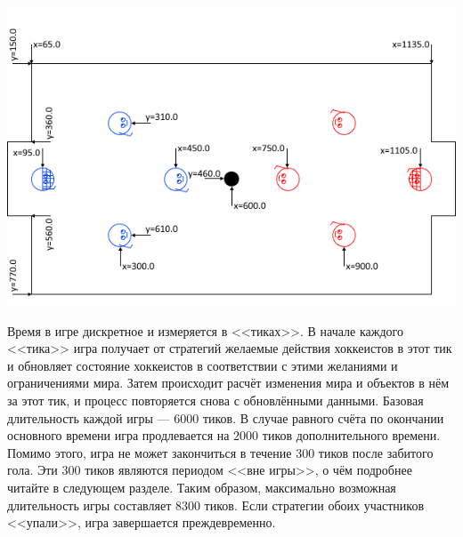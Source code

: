 \includegraphics{images/FieldScheme-3vs3-1200x800.png}

Время в игре дискретное и измеряется в <<тиках>>. В начале каждого <<тика>> игра получает от стратегий желаемые действия хоккеистов в этот
тик и обновляет состояние хоккеистов в соответствии с этими желаниями и ограничениями мира. Затем происходит расчёт изменения мира и
объектов в нём за этот тик, и процесс повторяется снова с обновлёнными данными. Базовая длительность каждой игры --- $6000$ тиков.
В случае равного счёта по окончании основного времени игра продлевается на $2000$ тиков дополнительного времени. Помимо этого, игра не может
закончиться в течение $300$ тиков после забитого гола. Эти $300$ тиков являются периодом <<вне игры>>, о чём подробнее читайте в следующем
разделе. Таким образом, максимально возможная длительность игры составляет $8300$ тиков. Если стратегии обоих участников <<упали>>, игра
завершается преждевременно.

